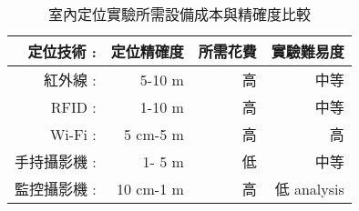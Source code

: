 \begin{table}[htbp]
  \centering
  \caption{室內定位實驗所需設備成本與精確度比較}
    \begin{tabular}{rrrr}
    \toprule
    定位技術 :  & 定位精確度 & 所需花費  &  實驗難易度 \\
    \midrule
    紅外線 :  &  5-10 m & 高 & 中等 \\
    RFID  :  &  1-10 m & 高 & 中等 \\
    Wi-Fi :  &  5 cm-5 m & 高 & 高 \\
    手持攝影機 :  & 1- 5 m  & 低 & 中等 \\
    監控攝影機 :  & 10 cm-1 m & 高 & 低  analysis \\
    \bottomrule
    \end{tabular}%
  \label{table:Indoor Localization analysis Table}%
\end{table}%
